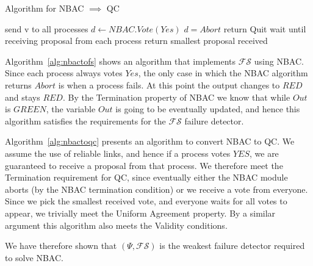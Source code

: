 \begin{algorithm}
\caption{Algorithm for NBAC $\implies$ QC}
\label{alg:nbactoqc}
\begin{algorithmic}[1]
    \State send v to all processes
    \State $d \gets NBAC.Vote(Yes)$
    \If $d = Abort$
        \State return Quit
    \Else
        \State wait until receiving proposal from each process
        \State return smallest proposal received
    \EndIf
\EndProcedure
\end{algorithmic}
\end{algorithm}

Algorithm~\ref{alg:nbactofs} shows an algorithm that implements $\mathcal{FS}$ using NBAC. Since each process always
votes $Yes$, the only case in which the NBAC algorithm returns $Abort$ is when a process fails. At this point the output
changes to $RED$ and stays $RED$. By the Termination property of NBAC we know that while $Out$ is $GREEN$, the
variable $Out$ is going to be eventually updated, and hence this algorithm satisfies the requirements for the
$\mathcal{FS}$ failure detector.

Algorithm~\ref{alg:nbactoqc} presents an algorithm to convert NBAC to QC. We assume the use of reliable links, and
hence if a process votes $YES$, we are guaranteed to receive a proposal from that process. We therefore meet the
Termination requirement for QC, since eventually either the NBAC module aborts (by the NBAC termination condition) or we
receive a vote from everyone. Since we pick the smallest received vote, and everyone waits for all votes to appear, we
trivially meet the Uniform Agreement property. By a similar argument this algorithm also meets the Validity conditions.

We have therefore shown that $(\Psi, \mathcal{FS})$ is the weakest failure detector required to solve NBAC.
